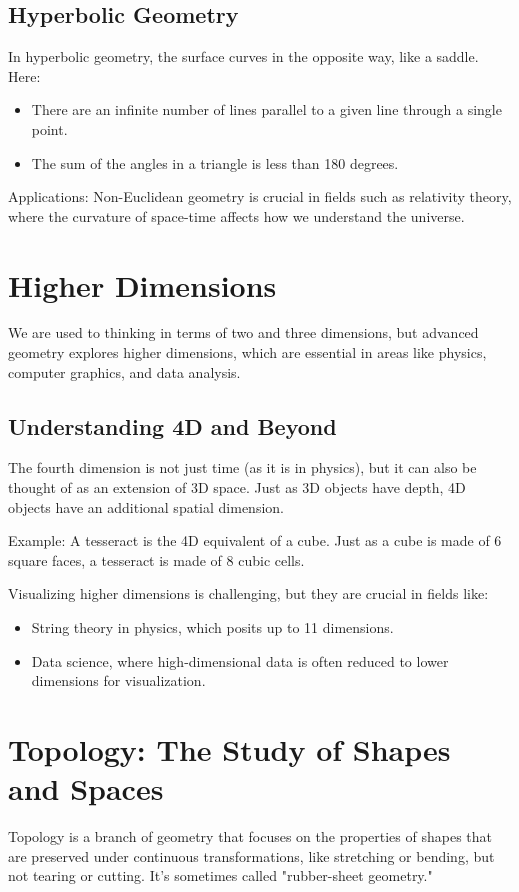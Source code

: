 \subsection{Hyperbolic Geometry}
In hyperbolic geometry, the surface curves in the opposite way, like a saddle. Here:
\begin{itemize}
    \item There are an infinite number of lines parallel to a given line through a single point.
    \item The sum of the angles in a triangle is less than 180 degrees.
\end{itemize}
Applications: Non-Euclidean geometry is crucial in fields such as relativity theory, where the curvature of space-time affects how we understand the universe.

\section{Higher Dimensions}
We are used to thinking in terms of two and three dimensions, but advanced geometry explores higher dimensions, which are essential in areas like physics, computer graphics, and data analysis.

\subsection{Understanding 4D and Beyond}
The fourth dimension is not just time (as it is in physics), but it can also be thought of as an extension of 3D space. Just as 3D objects have depth, 4D objects have an additional spatial dimension.

Example: A tesseract is the 4D equivalent of a cube. Just as a cube is made of 6 square faces, a tesseract is made of 8 cubic cells.

Visualizing higher dimensions is challenging, but they are crucial in fields like:
\begin{itemize}
    \item String theory in physics, which posits up to 11 dimensions.
    \item Data science, where high-dimensional data is often reduced to lower dimensions for visualization.
\end{itemize}

\section{Topology: The Study of Shapes and Spaces}
Topology is a branch of geometry that focuses on the properties of shapes that are preserved under continuous transformations, like stretching or bending, but not tearing or cutting. It’s sometimes called "rubber-sheet geometry."

